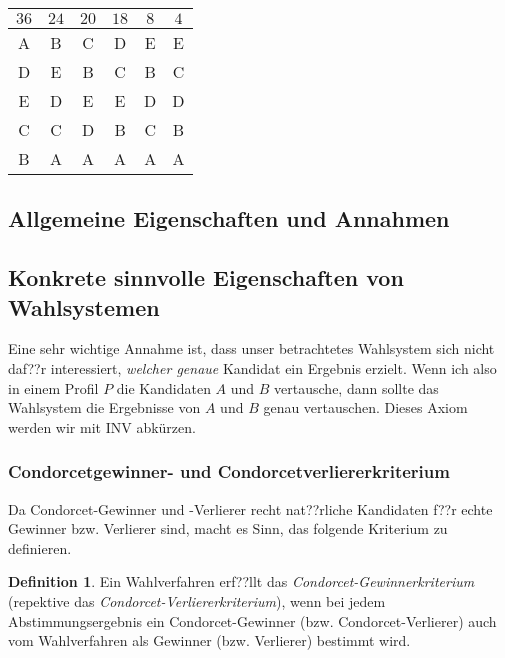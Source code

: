 \documentclass{zirkelblatt1415}
\theoremstyle{definition}
\newtheorem*{definition}{Definition}
\theoremstyle{definition}
\theoremstyle{definition}
\theoremstyle{definition}
\theoremstyle{remark}
\begin{document}
\begin{center}
    \begin{tabular}{cccccc}
    \toprule
     $36$ & $24$ & $20$ & $18$ & $8$ & $4$ \\ \midrule
    A & B & C & D & E & E \\[5pt]
    D & E & B & C & B & C \\[5pt]
    E & D & E & E & D & D \\[5pt]
    C & C & D & B & C & B \\[5pt]
    B & A & A & A & A & A \\
    \bottomrule
    \end{tabular}
\end{center}

\subsection{Allgemeine Eigenschaften und Annahmen}


\subsection{Konkrete sinnvolle Eigenschaften von Wahlsystemen}

Eine sehr wichtige Annahme ist, dass unser betrachtetes Wahlsystem sich nicht daf??r interessiert, \emph{welcher genaue} Kandidat ein Ergebnis erzielt. Wenn ich also in einem Profil $P$ die Kandidaten $A$ und $B$ vertausche, dann sollte das Wahlsystem die Ergebnisse von $A$ und $B$ genau vertauschen. Dieses Axiom werden wir mit INV abk\"urzen.

\subsubsection*{Condorcetgewinner- und Condorcetverliererkriterium}

Da Condorcet-Gewinner und -Verlierer recht nat??rliche Kandidaten f??r echte Gewinner bzw. Verlierer sind, macht es Sinn, das folgende Kriterium zu definieren.

\begin{definition}
Ein Wahlverfahren erf??llt das \emph{Condorcet-Gewinnerkriterium} (repektive das \emph{Condorcet-Verliererkriterium}), wenn bei jedem Abstimmungsergebnis ein Condorcet-Gewinner (bzw. Condorcet-Verlierer) auch vom Wahlverfahren als Gewinner (bzw. Verlierer) bestimmt wird.
\end{definition}
\end{document}
